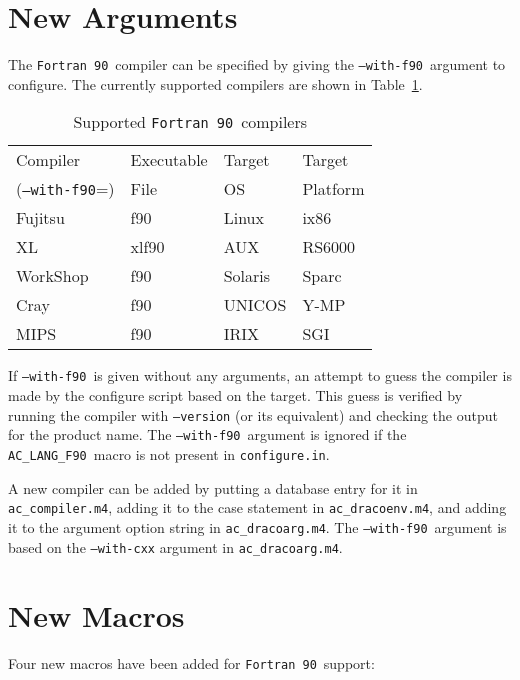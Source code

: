 \documentclass[11pt]{nmemo}
\newcommand{\fninety}{\texttt{Fortran~90}}
\newcommand{\withfninety}{\texttt{--with-f90}}
\newcommand{\langfninety}{\texttt{AC\_LANG\_F90}}
\begin{document}
\section{New Arguments}

The \fninety\ compiler can be specified by giving the \withfninety\ 
argument to configure.  The currently supported compilers are shown in
Table~\ref{tbl:compilers}.

\begin{table}[hb]
\begin{center}
\caption{Supported \fninety\ compilers}\label{tbl:compilers}
\begin{tabular}{l|l|l|l}
Compiler        & Executable & Target  & Target \\
(\withfninety=) & File       & OS      & Platform \\ \hline
Fujitsu         & f90        & Linux   & ix86 \\
XL	        & xlf90      & AUX     & RS6000 \\
WorkShop        & f90	     & Solaris & Sparc \\
Cray            & f90        & UNICOS  & Y-MP \\
MIPS            & f90        & IRIX    & SGI  
\end{tabular}
\end{center}
\end{table}
If \withfninety\ is given without any arguments, an attempt to guess the
compiler is made by the configure script based on the target.  This
guess is verified by running the compiler with \texttt{--version} (or
its equivalent) and checking the output for the product name.  The
\withfninety\ argument is ignored if the \langfninety\ macro is not
present in \texttt{configure.in}.

A new compiler can be added by putting a database entry for it in
\texttt{ac\_compiler.m4}, adding it to the case statement in
\texttt{ac\_dracoenv.m4}, and adding it to the argument option string
in \texttt{ac\_dracoarg.m4}.  The \withfninety\ argument is based on
the \texttt{--with-cxx} argument in \texttt{ac\_dracoarg.m4}.

\section{New Macros}

Four new macros have been added for \fninety\ support:
\end{document}
